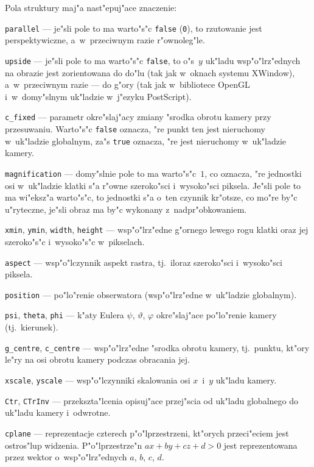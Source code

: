 Pola struktury maj"a nast"epuj"ace znaczenie:
\begin{mydescription}
  \item[]\texttt{parallel} --- je"sli pole to ma warto"s"c \texttt{false}
    (\texttt{0}), to rzutowanie jest perspektywiczne, a~w~przeciwnym razie
    r"ownoleg"le.
  \item[]\texttt{upside} --- je"sli pole to ma warto"s"c \texttt{false},
    to o"s~$y$ uk"ladu wsp"o"lrz"ednych na obrazie jest zorientowana
    do do"lu (tak jak w~oknach systemu XWindow), a~w~przeciwnym razie --- do
    g"ory (tak jak w~bibliotece OpenGL i~w~domy"slnym uk"ladzie w~j"ezyku
    PostScript).
  \item[]\texttt{c\_fixed} --- parametr okre"slaj"acy zmiany "srodka obrotu
    kamery przy przesuwaniu. Warto"s"c \texttt{false} oznacza, "re punkt ten
    jest nieruchomy w~uk"ladzie globalnym, za"s \texttt{true} oznacza, "re
    jest nieruchomy w~uk"ladzie kamery.
  \item[]\texttt{magnification} --- domy"slnie pole to ma warto"s"c~$1$,
    co oznacza, "re jednostki osi w~uk"ladzie klatki s"a r"owne szeroko"sci
    i~wysoko"sci piksela. Je"sli pole to ma wi"eksz"a warto"s"c, to
    jednostki s"a o~ten czynnik kr"otsze, co mo"re by"c u"ryteczne,
    je"sli obraz ma by"c wykonany z~nadpr"obkowaniem.
  \item[]\texttt{xmin}, \texttt{ymin}, \texttt{width}, \texttt{height} ---
    wsp"o"lrz"edne g"ornego lewego rogu klatki oraz jej szeroko"s"c
    i~wysoko"s"c w~pikselach.
  \item[]\texttt{aspect} --- wsp"o"lczynnik aspekt rastra, tj.\ iloraz
    szeroko"sci i~wysoko"sci piksela.
  \item[]\texttt{position} --- po"lo"renie obserwatora (wsp"o"lrz"edne
    w~uk"ladzie globalnym).
  \item[]\texttt{psi}, \texttt{theta},  \texttt{phi} --- k"aty Eulera
    $\psi$, $\vartheta$, $\varphi$ okre"slaj"ace po"lo"renie kamery (tj.\
    kierunek).
  \item[]\texttt{g\_centre}, \texttt{c\_centre} --- wsp"o"lrz"edne "srodka
    obrotu kamery, tj.\ punktu, kt"ory le"ry na osi obrotu kamery podczas
    obracania jej.
  \item[]\texttt{xscale}, \texttt{yscale} --- wsp"o"lczynniki skalowania osi
    $x$~i~$y$ uk"ladu kamery.
  \item[]\texttt{Ctr}, \texttt{CTrInv} --- przekszta"lcenia opisuj"ace
    przej"scia od uk"ladu globalnego do uk"ladu kamery i~odwrotne.
  \item[]\texttt{cplane} --- reprezentacje czterech p"o"lprzestrzeni,
    kt"orych przeci"eciem jest ostros"lup widzenia. P"o"lprzestrze"n
    $ax+by+cz+d>0$ jest reprezentowana przez wektor
    o~wsp"o"lrz"ednych $a$, $b$, $c$, $d$.


\end{mydescription}
